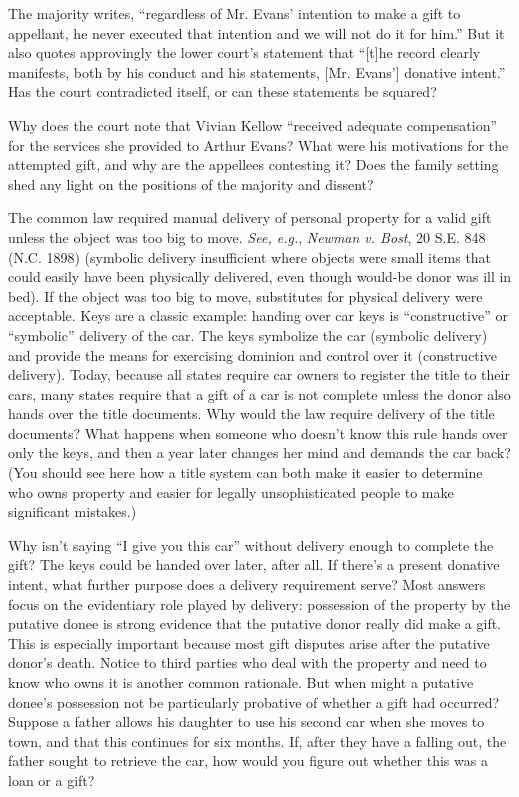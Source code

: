 
\item The majority writes, ``regardless of Mr. Evans' intention to make a gift
to appellant, he never executed that intention and we will not do it for him.''
But it also quotes approvingly the lower court's statement that ``[t]he record
clearly manifests, both by his conduct and his statements, [Mr. Evans']
donative intent.'' Has the court contradicted itself, or can these statements
be squared?

\item Why does the court note that Vivian Kellow ``received adequate
compensation'' for the services she provided to Arthur Evans? What were his
motivations for the attempted gift, and why are the appellees contesting it?
Does the family setting shed any light on the positions of the majority and
dissent?


\item The common law required manual delivery of personal property for a valid
gift unless the object was too big to move.  \emph{See, e.g.}, \emph{Newman v.
Bost}, 20 S.E.
848 (N.C. 1898) (symbolic delivery insufficient where objects were small items
that could easily have been physically delivered, even though would-be donor
was ill in bed).  If the object was too big to move, substitutes for physical
delivery were acceptable.  Keys are a classic example: handing over car keys is
``constructive'' or ``symbolic'' delivery of the car.  The keys symbolize the
car (symbolic delivery) and provide the means for exercising dominion and
control over it (constructive delivery).  Today, because all states require car
owners to register the title to their cars, many states require that a gift of
a car is not complete unless the donor also hands over the title documents. 
Why would the law require delivery of the title documents?  What happens when
someone who doesn't know this rule hands over only the keys, and then a year
later changes her mind and demands the car back?  (You should see here how a
title system can both make it easier to determine who owns property and easier
for legally unsophisticated people to make significant mistakes.)

Why isn't saying ``I give you this car'' without delivery enough to complete the
gift?  The keys could be handed over later, after all.  If there's a present
donative intent, what further purpose does a delivery requirement serve?  Most
answers focus on the evidentiary role played by delivery: possession of the
property by the putative donee is strong evidence that the putative donor
really did make a gift.  This is especially important because most gift
disputes arise after the putative donor's death.  Notice to third parties who
deal with the property and need to know who owns it is another common
rationale.  But when might a putative donee's possession not be particularly
probative of whether a gift had occurred?  Suppose a father allows his daughter
to use his second car when she moves to town, and that this continues for six
months.  If, after they have a falling out, the father sought to retrieve the
car, how would you figure out whether this was a loan or a gift? 



